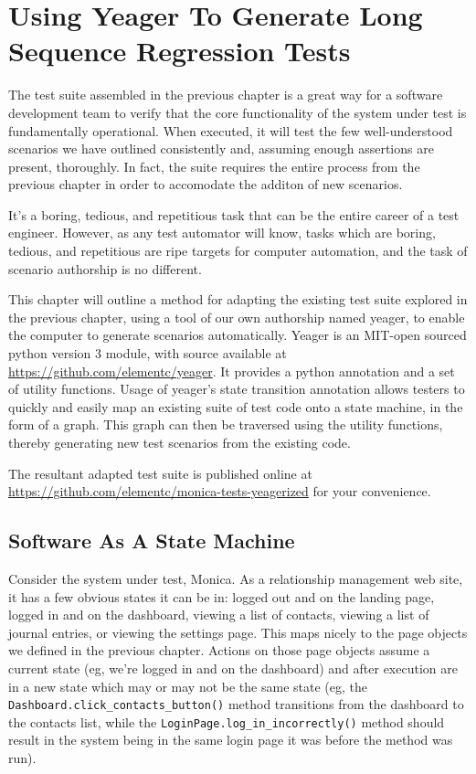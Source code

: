 \chapter{Using Yeager To Generate Long Sequence Regression Tests}
The test suite assembled in the previous chapter is a great way for a software development team to verify that the core functionality of the system under test is fundamentally operational. When executed, it will test the few well-understood scenarios we have outlined consistently and, assuming enough assertions are present, thoroughly. In fact, the suite requires the entire process from the previous chapter in order to accomodate the additon of new scenarios.

It's a boring, tedious, and repetitious task that can be the entire career of a test engineer. However, as any test automator will know, tasks which are boring, tedious, and repetitious are ripe targets for computer automation, and the task of scenario authorship is no different.

This chapter will outline a method for adapting the existing test suite explored in the previous chapter, using a tool of our own authorship named yeager, to enable the computer to generate scenarios automatically. Yeager is an MIT-open sourced python version 3 module, with source available at \url{https://github.com/elementc/yeager}. It provides a python annotation and a set of utility functions. Usage of yeager's state transition annotation allows testers to quickly and easily map an existing suite of test code onto a state machine, in the form of a graph. This graph can then be traversed using the utility functions, thereby generating new test scenarios from the existing code.

The resultant adapted test suite is published online at \url{https://github.com/elementc/monica-tests-yeagerized} for your convenience.

\section{Software As A State Machine}
Consider the system under test, Monica. As a relationship management web site, it has a few obvious states it can be in: logged out and on the landing page, logged in and on the dashboard, viewing a list of contacts, viewing a list of journal entries, or viewing the settings page. This maps nicely to the page objects we defined in the previous chapter. Actions on those page objects assume a current state (eg, we're logged in and on the dashboard) and after execution are in a new state which may or may not be the same state (eg, the \texttt{Dashboard.click\_contacts\_button()} method transitions from the dashboard to the contacts list, while the \texttt{LoginPage.log\_in\_incorrectly()} method should result in the system being in the same login page it was before the method was run).

